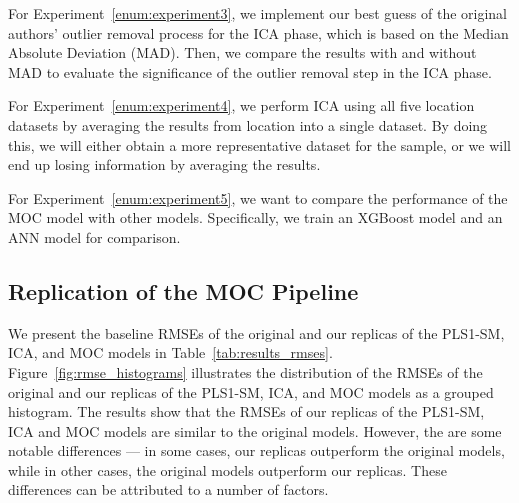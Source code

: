 For Experiment~\ref{enum:experiment3}, we implement our best guess of the original authors' outlier removal process for the ICA phase, which is based on the Median Absolute Deviation (MAD).
Then, we compare the results with and without MAD to evaluate the significance of the outlier removal step in the ICA phase.

For Experiment~\ref{enum:experiment4}, we perform ICA using all five location datasets by averaging the results from location into a single dataset.
By doing this, we will either obtain a more representative dataset for the sample, or we will end up losing information by averaging the results.

For Experiment~\ref{enum:experiment5}, we want to compare the performance of the MOC model with other models.
Specifically, we train an XGBoost model and an ANN model for comparison.

\subsection{Replication of the MOC Pipeline}\label{sec:replica_moc}
We present the baseline RMSEs of the original and our replicas of the PLS1-SM, ICA, and MOC models in Table~\ref{tab:results_rmses}.
Figure~\ref{fig:rmse_histograms} illustrates the distribution of the RMSEs of the original and our replicas of the PLS1-SM, ICA, and MOC models as a grouped histogram.
The results show that the RMSEs of our replicas of the PLS1-SM, ICA and MOC models are similar to the original models.
However, the are some notable differences --- in some cases, our replicas outperform the original models, while in other cases, the original models outperform our replicas.
These differences can be attributed to a number of factors.

